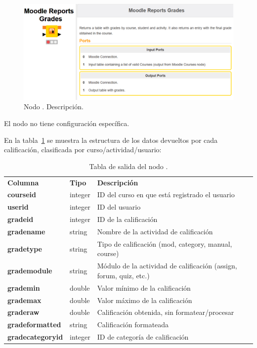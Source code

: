 \begin{figure}[!h]
	\centering
	\includegraphics[width=1\textwidth]{img/nodes_moodle_reports_grades.png}
	\caption{Nodo . Descripción.}
	\label{fig:moodlereportsgrades}
\end{figure}
\FloatBarrier

El nodo no tiene configuración específica. 
\

En la tabla~\ref{tab:moodle_reports_grades_desc} se muestra la estructura de los datos devueltos por cada calificación, clasificada por curso/actividad/usuario: 

\begin{table}[!h]
	\begin{center}
		\begin{tabular}{p{}p{}p{}}
			\toprule
			\textbf{Columna} & \textbf{Tipo} & \textbf{Descripción}\\
			\otoprule
			\textbf{courseid} & integer & ID del curso en que está registrado el usuario \\
         \hline
			\textbf{userid} & integer & ID del usuario \\
         \hline
         \textbf{gradeid} & integer & ID de la calificación \\
         \hline
         \textbf{gradename} & string & Nombre de la actividad de calificación \\
         \hline
         \textbf{gradetype} & string & Tipo de calificación (mod, category, manual, course) \\
         \hline
         \textbf{grademodule} & string & Módulo de la actividad de calificación (assign, forum, quiz, etc.) \\
         \hline
         \textbf{grademin} & double & Valor mínimo de la calificación \\
         \hline
         \textbf{grademax} & double & Valor máximo de la calificación \\
         \hline
         \textbf{graderaw} & double & Calificación obtenida, sin formatear/procesar \\
         \hline
         \textbf{gradeformatted} & string & Calificación formateada \\
         \hline
         \textbf{gradecategoryid} & integer & ID de categoría de calificación \\
         \bottomrule
		\end{tabular}
	\end{center}
	\caption{Tabla de salida del nodo .}
	\label{tab:moodle_reports_grades_desc}
\end{table}
\FloatBarrier

